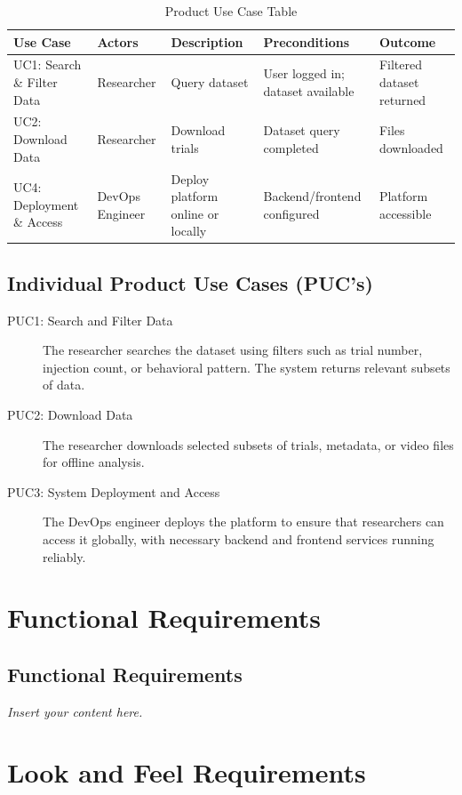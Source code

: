 \documentclass[12pt]{article}
\newcommand{\lips}{\textit{Insert your content here.}}
\begin{document}
\begin{table}[h!]
\centering
\begin{tabular}{|p{2.5cm}|p{2cm}|p{3.0cm}|p{3.0cm}|p{2.5cm}|}
\hline
\textbf{Use Case} & \textbf{Actors} & \textbf{Description} & \textbf{Preconditions} & \textbf{Outcome} \\
\hline
UC1: Search \& Filter Data & Researcher & Query dataset & User logged in; dataset available & Filtered dataset returned \\
\hline
UC2: Download Data & Researcher & Download trials & Dataset query completed & Files downloaded \\
\hline
UC4: Deployment \& Access & DevOps Engineer & Deploy platform online or locally & Backend/frontend configured & Platform accessible \\
\hline
\end{tabular}
\caption{Product Use Case Table}
\end{table}

\subsection{Individual Product Use Cases (PUC’s)}

\begin{description}
\item[PUC1: Search and Filter Data] The researcher searches the dataset using filters such as trial number, injection count, or behavioral pattern. The system returns relevant subsets of data.
\item[PUC2: Download Data] The researcher downloads selected subsets of trials, metadata, or video files for offline analysis.
\item[PUC3: System Deployment and Access] The DevOps engineer deploys the platform to ensure that researchers can access it globally, with necessary backend and frontend services running reliably.
\end{description}

\section{Functional Requirements}
\subsection{Functional Requirements}
\lips

\section{Look and Feel Requirements}
\end{document}
